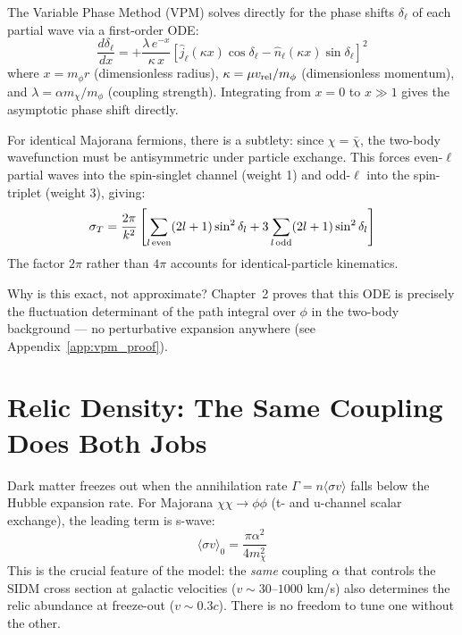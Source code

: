 The Variable Phase Method (VPM) solves directly for the phase shifts
$\delta_\ell$ of each partial wave via a first-order ODE:
\begin{equation}
  \frac{d\delta_\ell}{dx} = +\frac{\lambda\,e^{-x}}{\kappa\,x}
  \left[\hat{j}_\ell(\kappa x)\cos\delta_\ell - \hat{n}_\ell(\kappa x)\sin\delta_\ell\right]^2
\end{equation}
where $x = m_\phi r$ (dimensionless radius), $\kappa = \mu v_{\rm rel}/m_\phi$
(dimensionless momentum), and $\lambda = \alpha m_\chi/m_\phi$ (coupling strength).
Integrating from $x=0$ to $x \gg 1$ gives the asymptotic phase shift directly.

For identical Majorana fermions, there is a subtlety: since $\chi = \bar{\chi}$,
the two-body wavefunction must be antisymmetric under particle exchange.
This forces even-$\ell$ partial waves into the spin-singlet channel (weight 1)
and odd-$\ell$ into the spin-triplet (weight 3), giving:
\begin{equation}
  \sigma_T = \frac{2\pi}{k^2}\left[\sum_{l\,\rm even}(2l+1)\sin^2\delta_l
             + 3\sum_{l\,\rm odd}(2l+1)\sin^2\delta_l\right]
\end{equation}
The factor $2\pi$ rather than $4\pi$ accounts for identical-particle kinematics.

Why is this exact, not approximate? Chapter~2 proves that this ODE is
precisely the fluctuation determinant of the path integral over $\phi$
in the two-body background — no perturbative expansion anywhere
(see Appendix~\ref{app:vpm_proof}).

\section{Relic Density: The Same Coupling Does Both Jobs}
\label{ch1:relic}

Dark matter freezes out when the annihilation rate $\Gamma = n\langle\sigma v\rangle$
falls below the Hubble expansion rate. For Majorana $\chi\chi \to \phi\phi$
(t- and u-channel scalar exchange), the leading term is s-wave:
\begin{equation}
  \langle\sigma v\rangle_0 = \frac{\pi\alpha^2}{4m_\chi^2}
\end{equation}
This is the crucial feature of the model: the \emph{same} coupling $\alpha$
that controls the SIDM cross section at galactic velocities ($v \sim 30$--$1000$
km/s) also determines the relic abundance at freeze-out ($v \sim 0.3c$).
There is no freedom to tune one without the other.

